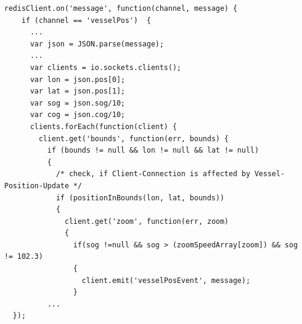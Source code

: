 \begin{lstlisting}[caption= Weiterleitung von Positions-Updates an Websocket-Clients in worker.js, label= Weiterleitung von Positions-Updates an Websocket-Clients in worker.js]
 redisClient.on('message', function(channel, message) {
    if (channel == 'vesselPos')  {
      ...
      var json = JSON.parse(message);
      ...
      var clients = io.sockets.clients();
      var lon = json.pos[0];
      var lat = json.pos[1];
      var sog = json.sog/10;
      var cog = json.cog/10;
      clients.forEach(function(client) {
        client.get('bounds', function(err, bounds) {
          if (bounds != null && lon != null && lat != null) 
          {
            /* check, if Client-Connection is affected by Vessel-Position-Update */
            if (positionInBounds(lon, lat, bounds)) 
            {
              client.get('zoom', function(err, zoom) 
              {
                if(sog !=null && sog > (zoomSpeedArray[zoom]) && sog != 102.3)
                {
                  client.emit('vesselPosEvent', message);
                }
          ...
  });
\end{lstlisting}

